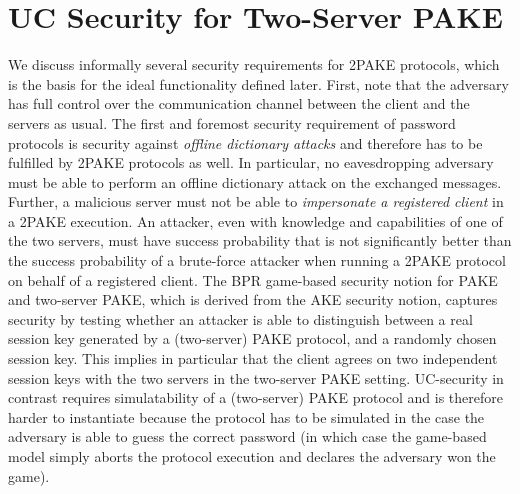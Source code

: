 \section{UC Security for Two-Server PAKE} \label{sec:uc2pake}

We discuss informally several security requirements for 2PAKE protocols, which is the basis for the ideal functionality \FTWOPAKE defined later.
First, note that the adversary has full control over the communication channel between the client and the servers as usual.
The first and foremost security requirement of password protocols is security against \emph{offline dictionary attacks} and therefore has to be fulfilled by 2PAKE protocols as well.
In particular, no eavesdropping adversary must be able to perform an offline dictionary attack on the exchanged messages.
Further, a malicious server must not be able to \emph{impersonate a registered client} in a 2PAKE execution.
An attacker, even with knowledge and capabilities of one of the two servers, must have success probability that is not significantly better than the success probability of a brute-force attacker when running a 2PAKE protocol on behalf of a registered client.
The BPR game-based security notion for PAKE and two-server PAKE, which is derived from the AKE security notion, captures security by testing whether an attacker is able to distinguish between a real session key generated by a (two-server) PAKE protocol, and a randomly chosen session key.
This implies in particular that the client agrees on two independent session keys with the two servers in the two-server PAKE setting.
UC-security in contrast requires simulatability of a (two-server) PAKE protocol and is therefore harder to instantiate because the protocol has to be simulated in the case the adversary is able to guess the correct password (in which case the game-based model simply aborts the protocol execution and declares the adversary won the game).



